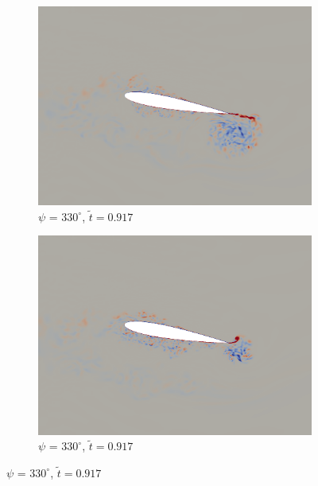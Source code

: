 \begin{figure}[H]
	\begin{subfigure}[b]{0.4\textwidth}
		\centering
		\includegraphics[width=1\textwidth]{figures/mu_1pt5/vorticity/baseline/phase_330.png}
		\caption{ $\psi$ = $330^\circ$, $\tilde{t}=0.917$}
		\label{fig:mu_1pt5_baseline_psi330}
	\end{subfigure}
	\begin{subfigure}[b]{0.4\textwidth}
		\centering
		\includegraphics[width=1\textwidth]{figures/mu_1pt5/vorticity/AC/phase_330.png}
		\caption{ $\psi$ = $330^\circ$, $\tilde{t}=0.917$}
		\label{fig:mu_1pt5_AC_psi330}
	\end{subfigure}
	
	

\end{figure}
